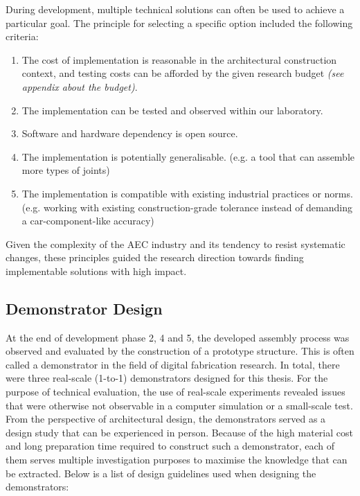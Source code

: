 During development, multiple technical solutions can often be used to achieve a particular goal. The principle for selecting a specific option included the following criteria: 

\begin{enumerate}
	\item The cost of implementation is reasonable in the architectural construction context, and testing costs can be afforded by the given research budget \textit{(see appendix about the budget)}.

	\item The implementation can be tested and observed within our laboratory.

	\item Software and hardware dependency is open source.

	\item The implementation is potentially generalisable. (e.g. a tool that can assemble more types of joints)

	\item The implementation is compatible with existing industrial practices or norms. (e.g. working with existing construction-grade tolerance instead of demanding a car-component-like accuracy) 

\end{enumerate}
Given the complexity of the AEC industry and its tendency to resist systematic changes, these principles guided the research direction towards finding implementable solutions with high impact.

\subsection{Demonstrator Design}
\label{subsection:methodology_demonstraror_design}

At the end of development phase 2, 4 and 5, the developed assembly process was observed and evaluated by the construction of a prototype structure. This is often called a demonstrator in the field of digital fabrication research. In total, there were three real-scale (1-to-1) demonstrators designed for this thesis. For the purpose of technical evaluation, the use of real-scale experiments revealed issues that were otherwise not observable in a computer simulation or a small-scale test. From the perspective of architectural design, the demonstrators served as a design study that can be experienced in person. Because of the high material cost and long preparation time required to construct such a demonstrator, each of them serves multiple investigation purposes to maximise the knowledge that can be extracted. Below is a list of design guidelines used when designing the demonstrators:

